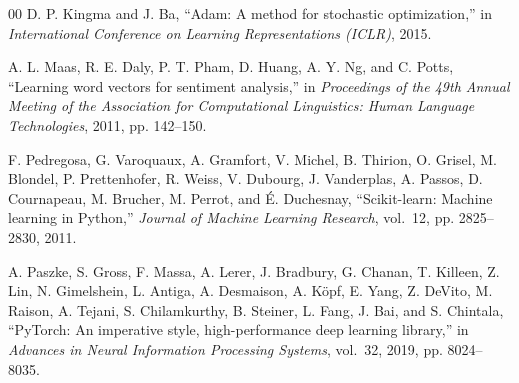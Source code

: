 \documentclass[conference]{IEEEtran}
\begin{document}
\begin{thebibliography}{00}
D. P. Kingma and J. Ba,
``Adam: A method for stochastic optimization,''
in \textit{International Conference on Learning Representations (ICLR)}, 2015.

A. L. Maas, R. E. Daly, P. T. Pham, D. Huang, A. Y. Ng, and C. Potts,
``Learning word vectors for sentiment analysis,''
in \textit{Proceedings of the 49th Annual Meeting of the Association for Computational Linguistics: Human Language Technologies}, 2011, pp. 142--150.

F. Pedregosa, G. Varoquaux, A. Gramfort, V. Michel, B. Thirion, O. Grisel, M. Blondel, P. Prettenhofer, R. Weiss, V. Dubourg, J. Vanderplas, A. Passos, D. Cournapeau, M. Brucher, M. Perrot, and É. Duchesnay,
``Scikit-learn: Machine learning in Python,''
\textit{Journal of Machine Learning Research}, vol.~12, pp. 2825--2830, 2011.

A. Paszke, S. Gross, F. Massa, A. Lerer, J. Bradbury, G. Chanan, T. Killeen, Z. Lin, N. Gimelshein, L. Antiga, A. Desmaison, A. Köpf, E. Yang, Z. DeVito, M. Raison, A. Tejani, S. Chilamkurthy, B. Steiner, L. Fang, J. Bai, and S. Chintala,
``PyTorch: An imperative style, high-performance deep learning library,''
in \textit{Advances in Neural Information Processing Systems}, vol.~32, 2019, pp. 8024--8035.

\end{thebibliography}
\end{document}
